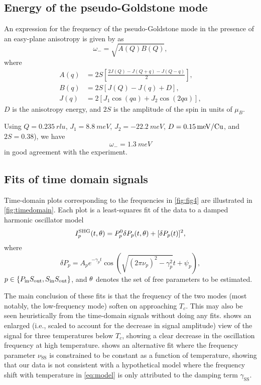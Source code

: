 \subsection{Energy of the pseudo-Goldstone mode}\label{sup:anisotropyenergy}
An expression for the frequency of the pseudo-Goldstone mode in the presence of an easy-plane anisotropy is given by \citet{katsura_dynamical_2007} as
\begin{equation}
\omega_- = \sqrt{A(Q)B(Q)},
\end{equation}
where
\begin{align}
A(q) &= 2S\left[\frac{2J(Q)-J(Q+q)-J(Q-q)}{2}\right],\\
B(q) &= 2S\left[J(Q)-J(q)+D\right],\\
J(q) &= 2\left[J_1\cos(qa)+J_2\cos(2qa)\right],
\end{align}
$D$ is the anisotropy energy, and $2S$ is the amplitude of the spin in units of $\mu_B$.

Using $Q=\qty{0.235}{rlu}$\citep{zhao_cubr2_2012}, $J_1=\qty{8.8}{meV}$\citep{lebernegg_magnetism_2013}, $J_2=\qty{-22.2}{meV}$\citep{lebernegg_magnetism_2013}, $D=\qty{0.15}{meV/\ce{Cu}}$\citep{lee_investigation_2012}, and $2S=\num{0.38}$\citep{lee_investigation_2012}), we have
\begin{equation}
\omega_- = \qty{1.3}{meV}
\end{equation}
in good agreement with the experiment.

\subsection{Fits of time domain signals}\label{sup:timedomain}
Time-domain plots corresponding to the frequencies in \cref{fig:fig4} are illustrated in \cref{fig:timedomain}.
Each plot is a least-squares fit of the data to a damped harmonic oscillator model
\begin{equation}
I^\mathrm{SHG}_p(t, \theta) = P^0_p\delta P_p(t, \theta)+[\delta P_p(t)]^2,
\end{equation}
where
\begin{equation}\label{eq:model}
\delta P_p = A_pe^{-\gamma_p t}\cos\left(\sqrt{(2\pi\nu_p)^2-\gamma_p^2}t+\psi_p\right),
\end{equation}
$p \in \{P_\mathrm{in}S_\mathrm{out}, S_\mathrm{in}S_\mathrm{out}\}$, and $\theta$ denotes the set of free parameters to be estimated.

The main conclusion of these fits is that the frequency of the two modes (most notably, the low-frequency \SS mode) soften on approaching $T_c$.
This may also be seen heuristically from the time-domain signals without doing any fits.
 shows an enlarged (i.e., scaled to account for the decrease in signal amplitude) view of the \SS signal for three temperatures below $T_c$, showing a clear decrease in the oscillation frequency at high temperature.
 shows an alternative fit where the frequency parameter $\nu_\mathrm{SS}$ is constrained to be constant as a function of temperature, showing that our data is not consistent with a hypothetical model where the frequency shift with temperature in \cref{eq:model} is only attributed to the damping term $\gamma_\mathrm{SS}$.

